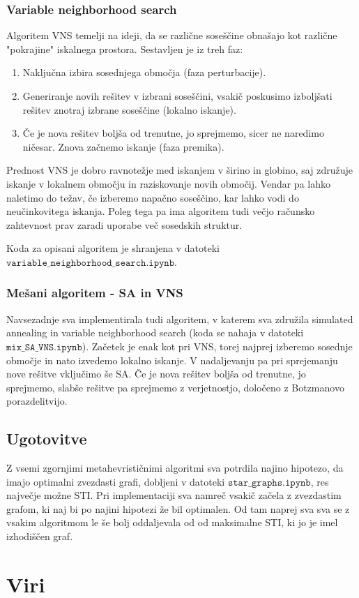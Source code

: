 \documentclass[a4paper,12pt]{article}
\begin{document}
\subsubsection{Variable neighborhood search}
Algoritem VNS temelji na ideji, da se različne soseščine obnašajo kot različne "pokrajine" iskalnega prostora. Sestavljen je iz treh faz:
\begin{enumerate}
      \item Naključna izbira sosednjega območja (faza perturbacije).
      \item Generiranje novih rešitev v izbrani soseščini, vsakič poskusimo izboljšati rešitev znotraj izbrane soseščine (lokalno iskanje).
      \item Če je nova rešitev boljša od trenutne, jo sprejmemo, sicer ne naredimo ničesar. Znova začnemo iskanje (faza premika).
\end{enumerate}
Prednost VNS je dobro ravnotežje med iskanjem v širino in globino, saj združuje iskanje v lokalnem območju in raziskovanje novih območij. Vendar
pa lahko naletimo do težav, če izberemo napačno soseščino, kar lahko vodi do neučinkovitega iskanja. Poleg tega pa ima algoritem tudi večjo
računsko zahtevnost prav zaradi uporabe več sosedskih struktur.

Koda za opisani algoritem je shranjena v datoteki \\$\texttt{variable\_neighborhood\_search.ipynb}$.

\subsubsection{Mešani algoritem - SA in VNS}
Navsezadnje sva implementirala tudi algoritem, v katerem sva združila simulated annealing in variable neighborhood search (koda se nahaja
v datoteki $\texttt{mix\_SA\_VNS.ipynb}$). Začetek je enak kot pri VNS, torej najprej izberemo sosednje območje in nato izvedemo lokalno iskanje. 
V nadaljevanju pa pri sprejemanju nove rešitve vključimo še SA. Če je nova rešitev boljša od trenutne, jo sprejmemo, slabše rešitve pa sprejmemo
z verjetnostjo, določeno z Botzmanovo porazdelitvijo. 

\subsection{Ugotovitve}
Z vsemi zgornjimi metahevrističnimi algoritmi sva potrdila najino hipotezo, da imajo optimalni zvezdasti grafi, dobljeni v datoteki 
$\texttt{star\_graphs.ipynb}$, res največje možne STI. Pri implementaciji sva namreč vsakič začela z zvezdastim grafom, ki naj 
bi po najini hipotezi že bil optimalen. Od tam naprej sva sva se z vsakim algoritmom le še bolj oddaljevala od od maksimalne STI, ki
jo je imel izhodiščen graf. 

\nocite{Luke2013Metaheuristics}

\section{Viri}


      
\end{document}
